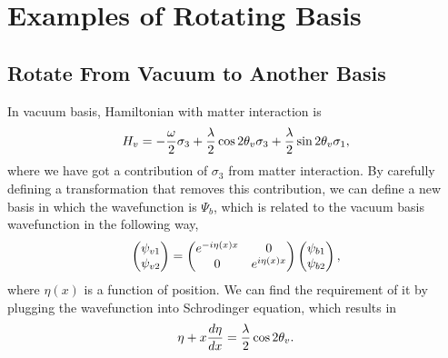 \documentclass[letterpaper,12pt,english]{sphinxmanual}
\begin{document}
\section{Examples of Rotating Basis}
\label{basis:examples-of-rotating-basis}

\subsection{Rotate From Vacuum to Another Basis}
\label{basis:rotate-from-vacuum-to-another-basis}
In vacuum basis, Hamiltonian with matter interaction is
\begin{gather}
\begin{split}H_v = -\frac{\omega}{2} \sigma_3 + \frac{\lambda}{2}\cos 2\theta_v \sigma_3 + \frac{\lambda}{2} \sin 2\theta_v \sigma_1,\end{split}\notag
\end{gather}
where we have got a contribution of \(\sigma_3\) from matter interaction. By carefully defining a transformation that removes this contribution, we can define a new basis in which the wavefunction is \(\Psi_b\), which is related to the vacuum basis wavefunction in the following way,
\begin{gather}
\begin{split}\begin{pmatrix}\psi_{v1} \\ \psi_{v2} \end{pmatrix}  = \begin{pmatrix}
e^{-i \eta(x) x} & 0 \\  0 & e^{i \eta(x) x}
\end{pmatrix} \begin{pmatrix}\psi_{b1} \\ \psi_{b2} \end{pmatrix},\end{split}\notag
\end{gather}
where \(\eta(x)\) is a function of position. We can find the requirement of it by plugging the wavefunction into Schrodinger equation, which results in
\begin{gather}
\begin{split}\eta + x \frac{d\eta }{dx} = \frac{\lambda}{2} \cos 2\theta_v.\end{split}\notag
\end{gather}
\end{document}
